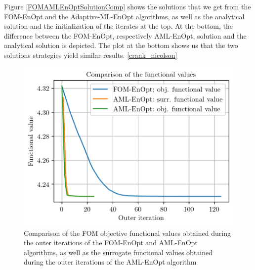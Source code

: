 Figure \ref{FOMAMLEnOptSolutionComp} shows the solutions that we get from the FOM-EnOpt and the Adaptive-ML-EnOpt algorithms, as well as the analytical solution and the initialization of the iterates at the top. At the bottom, the difference between the FOM-EnOpt, respectively AML-EnOpt, solution and the analytical solution is depicted. The plot at the bottom shows us that the two solutions strategies yield similar results. 
\eqref{crank_nicolson}

\begin{figure}
\centering
\includegraphics{Plots/functionalValueComp.png}
\caption{\label{FOMAMLEnOptFuncValComp}Comparison of the FOM objective functional values obtained during the outer iterations of the FOM-EnOpt and AML-EnOpt algorithms, as well as the surrogate functional values obtained during the outer iterations of the AML-EnOpt algorithm}
\end{figure}

